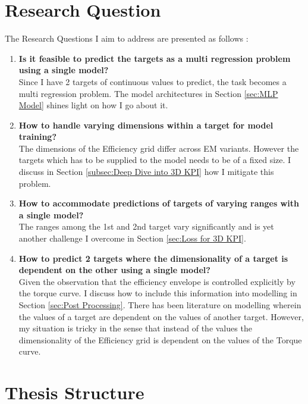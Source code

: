 \documentclass{report} %
\begin{document}
\section{Research Question}\label{sec:Research Question}

The Research Questions I aim to address are presented as follows :
 
\begin{enumerate}[nosep]
    \item \textbf{Is it feasible to predict the targets as a multi regression problem using a single model?}\\
    Since I have 2 targets of continuous values to predict, the task becomes a multi regression problem. The model architectures in Section \ref{sec:MLP Model} 
    shines light on how I go about it.
    \item \textbf{How to handle varying dimensions within a target for model training?}\\
    The dimensions of the Efficiency grid differ across \ac{EM} variants. However the targets which has to be supplied to the model needs to be of a fixed size.
    I discuss in Section \ref{subsec:Deep Dive into 3D KPI} how I mitigate this problem.
    \item \textbf{How to accommodate predictions of targets of varying ranges with a single model?}\\
    The ranges among the 1st and 2nd target vary significantly and is yet another challenge I overcome in Section \ref{sec:Loss for 3D KPI}.
    \item \textbf{How to predict 2 targets where the dimensionality of a target is dependent on the other using a single model?}\\
    Given the observation that the efficiency envelope is controlled explicitly by the torque curve. I discuss how to include this information into modelling in Section \ref{sec:Post Processing}. 
    There has been literature on modelling wherein the values of a target are dependent on the values of another target. However, my situation is tricky in the sense 
    that instead of the values the dimensionality of the Efficiency grid is dependent on the values of the Torque curve.
\end{enumerate}

\section{Thesis Structure}\label{sec:Thesis Structure}
\end{document}
